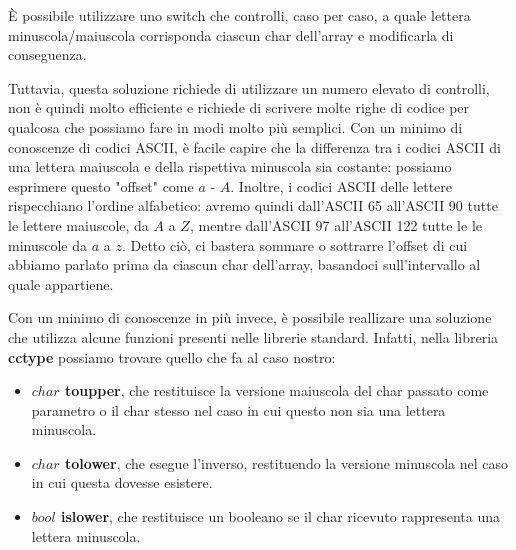 
\casebycase
È possibile utilizzare uno switch che controlli, caso per caso, a quale lettera minuscola/maiuscola corrisponda ciascun char dell'array e modificarla di conseguenza.

Tuttavia, questa soluzione richiede di utilizzare un numero elevato di controlli, non è quindi molto efficiente e richiede di scrivere molte righe di codice per qualcosa che possiamo fare in modi molto più semplici.
\somma
Con un minimo di conoscenze di codici ASCII, è facile capire che la differenza tra i codici ASCII di una lettera maiuscola e della rispettiva minuscola sia costante: possiamo esprimere questo "offset" come $a$ - $A$. Inoltre, i codici ASCII delle lettere rispecchiano l'ordine alfabetico: avremo quindi dall'ASCII 65 all'ASCII 90 tutte le lettere maiuscole, da $A$ a $Z$, mentre dall'ASCII 97 all'ASCII 122 tutte le le minuscole da $a$ a $z$.
Detto ciò, ci bastera sommare o sottrarre l'offset di cui abbiamo parlato prima da ciascun char dell'array, basandoci sull'intervallo al quale appartiene.
\newline
\newline
\colorbox{white}{}
\begin{comment}
   \begin{lstlisting}[language=C++]
void aggiusta(int N, char s[]) {
	for (int i = 0; i < N; i++) {
        char c = s[i];
        if (c >= 'a' && c <= 'z')
            s[i] = c - 'a' + 'A';
        else if (c >= 'A' && c <= 'Z')
            s[i] = c - 'A' + 'a';
    }
}
    \end{lstlisting}
\end{comment}
\funzioni
Con un minimo di conoscenze in più invece, è possibile reallizare una soluzione che utilizza alcune funzioni presenti nelle librerie standard.\newline
Infatti, nella libreria \textbf{cctype} possiamo trovare quello che fa al caso nostro:\begin{itemize}
\item \textbf{$char$ toupper}, che restituisce la versione maiuscola del char passato come parametro o il char stesso nel caso in cui questo non sia una lettera minuscola.
\item \textbf{$char$ tolower}, che esegue l'inverso, restituendo la versione minuscola nel caso in cui questa dovesse esistere.
\item\textbf{$bool$ islower}, che restituisce un booleano se il char ricevuto rappresenta una lettera minuscola.
\end{itemize}
